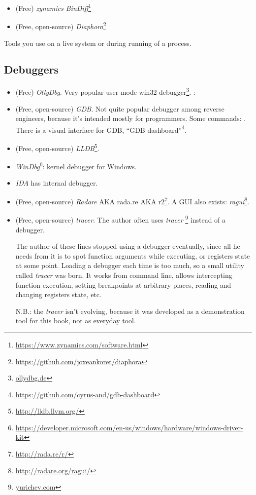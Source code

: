 \begin{itemize}
\item (Free) \emph{zynamics BinDiff}\footnote{\url{https://www.zynamics.com/software.html}}

\item (Free, open-source) \emph{Diaphora}\footnote{\url{https://github.com/joxeankoret/diaphora}}
\end{itemize}


Tools you use on a live system or during running of a process.

\subsection{Debuggers}

\myindex{\olly}

\begin{itemize}
\item (Free) \emph{OllyDbg}.
Very popular user-mode win32 debugger\footnote{\href{http://go.yurichev.com/17032}{ollydbg.de}}.
\ShortHotKeyCheatsheet: 

\item (Free, open-source) \emph{GDB}.
Not quite popular debugger among reverse engineers, because it's intended mostly for programmers.
Some commands: .
There is a visual interface for GDB, ``GDB dashboard''\footnote{\url{https://github.com/cyrus-and/gdb-dashboard}}.

\item (Free, open-source) \emph{LLDB}\footnote{\url{http://lldb.llvm.org/}}.

\item \emph{WinDbg}\footnote{\url{https://developer.microsoft.com/en-us/windows/hardware/windows-driver-kit}}:
kernel debugger for Windows.

\item \emph{IDA} has internal debugger.

\item (Free, open-source) \emph{Radare} \ac{AKA} rada.re \ac{AKA} r2\footnote{\url{http://rada.re/r/}}.
A GUI also exists: \emph{ragui}\footnote{\url{http://radare.org/ragui/}}.

\item (Free, open-source) \emph{tracer}.
\label{tracer}
The author often uses \emph{tracer}
\footnote{\href{http://go.yurichev.com/17338}{yurichev.com}}
instead of a debugger.

The author of these lines stopped using a debugger eventually, since all he needs from it is to spot function arguments while
executing, or registers state at some point.
Loading a debugger each time is too much, so a small utility called \emph{tracer} was born.
It works from command line, allows intercepting function execution,
setting breakpoints at arbitrary places, reading and changing registers state, etc.

N.B.: the \emph{tracer} isn't evolving, because it was developed as a demonstration tool for this book, not as everyday tool.
\end{itemize}

